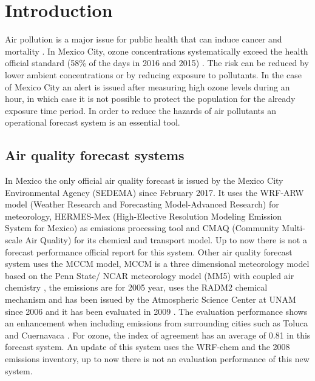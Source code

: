 \section{Introduction}
Air pollution is a major issue for public health that can induce cancer and mortality 
\cite{Pope2002,SMITH20092091}. In Mexico City, ozone concentrations systematically exceed the 
health official standard (58\% of the days in 2016 and 2015) \cite{sedema_dias2016}. The 
risk can be reduced by lower ambient concentrations or by reducing exposure to pollutants. 
In the case of Mexico City an alert is issued after measuring high ozone 
levels during an hour, in which case it is not possible to protect the population for 
the already exposure time period. In order to reduce the hazards of air pollutants an
operational forecast system is an essential tool.

\subsection{Air quality forecast systems}

In Mexico  the only official air quality forecast is issued by the Mexico City Environmental 
Agency (SEDEMA) since February 2017. It uses the WRF-ARW model (Weather Research and 
Forecasting Model-Advanced Research) \cite{huang2008description} for meteorology, HERMES-Mex 
(High-Elective Resolution Modeling Emission System for Mexico) as emissions processing tool 
\cite{GUEVARA2017882} and CMAQ (Community Multi-scale Air Quality) \cite{byun2006review} for 
its chemical and transport model. Up to now there is not a forecast performance official report for 
this system.
Other air quality forecast system uses the MCCM model, MCCM is a three dimensional meteorology 
model based on the Penn State/ NCAR meteorology model (MM5) with coupled air chemistry  
\cite{GRELL20001435}, the emissions are for 2005 year, uses the RADM2 chemical mechanism 
and has been issued by the Atmospheric Science Center at UNAM since 2006 \cite{hernandez2006} 
and it has been evaluated in 2009 \cite{resendiz2009}. The evaluation performance shows 
an enhancement when including emissions from surrounding cities such as Toluca and Cuernavaca 
\cite{garcia2009ozone}. For ozone, the index of agreement has an average of 0.81 in 
this forecast system. An update of this system uses the WRF-chem \cite{grell2005fully} 
and the 2008 emissions inventory, up to now there is not an evaluation performance 
of this new system.

